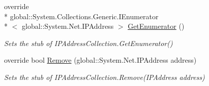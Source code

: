 \begin{DoxyCompactItemize}
override \\*
global\-::\-System.\-Collections.\-Generic.\-I\-Enumerator\\*
$<$ global\-::\-System.\-Net.\-I\-P\-Address $>$ \hyperlink{class_system_1_1_net_1_1_network_information_1_1_fakes_1_1_stub_i_p_address_collection_ae73ba71d6cafc916315a626600b22e26}{Get\-Enumerator} ()
\begin{DoxyCompactList}\small\item\em Sets the stub of I\-P\-Address\-Collection.\-Get\-Enumerator()\end{DoxyCompactList}\item 
override bool \hyperlink{class_system_1_1_net_1_1_network_information_1_1_fakes_1_1_stub_i_p_address_collection_afa67e0a0686871370273634d0453f253}{Remove} (global\-::\-System.\-Net.\-I\-P\-Address address)
\begin{DoxyCompactList}\small\item\em Sets the stub of I\-P\-Address\-Collection.\-Remove(\-I\-P\-Address address)\end{DoxyCompactList}\end{DoxyCompactItemize}
